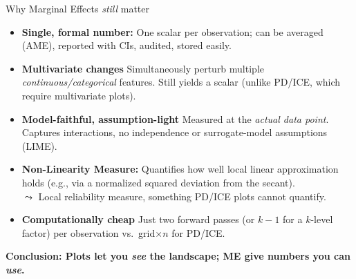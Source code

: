 \documentclass[11pt,compress,t,notes=noshow, aspectratio=169, xcolor=table]{beamer}
\begin{document}
\begin{frame}{Why Marginal Effects \emph{still} matter}

\begin{itemize}\setlength\itemsep{0.55em}
\item \textbf{Single, formal number:} One \alert{scalar} per observation; can be averaged (AME), reported with CIs, audited, stored easily.

\item \textbf{Multivariate changes}  
      Simultaneously perturb multiple \emph{continuous/categorical} features.
       Still yields a scalar (unlike PD/ICE, which require multivariate plots).

\item \textbf{Model-faithful, assumption-light}  
      Measured at the \emph{actual data point}.
      Captures interactions, no independence or surrogate-model assumptions (LIME).

\item \textbf{Non-Linearity Measure:}  
Quantifies how well local linear approximation holds (e.g., via a normalized squared deviation from the secant). \\
$\leadsto$ Local reliability measure, something PD/ICE plots cannot quantify.
\item \textbf{Computationally cheap}  
      Just two forward passes (or \(k\!-\!1\) for a \(k\)-level factor) per observation vs.\ grid\(\times n\) for PD/ICE.

\end{itemize}

\vspace{0.3em}
\begin{center}
\textbf{Conclusion: Plots let you \emph{see} the landscape;\quad  
ME give numbers you can \emph{use}.}
\end{center}

\end{frame}
\end{document}
